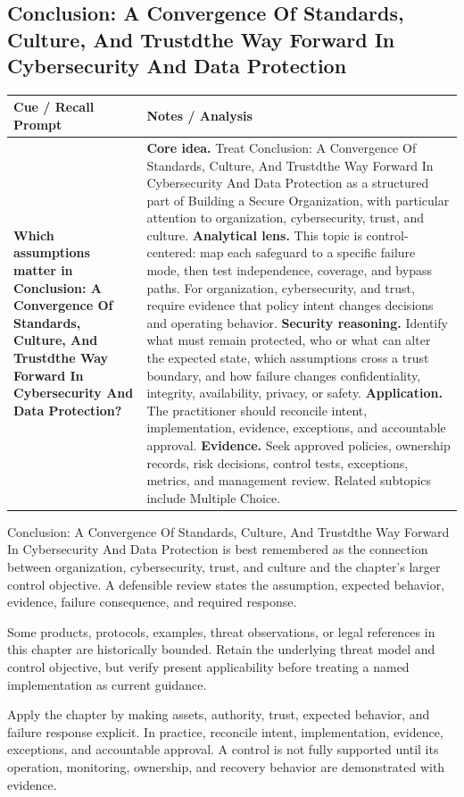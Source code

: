 \documentclass[11pt]{article}
\newcommand{\CornellHeader}{%
\rowcolor{Navy}\color{white}\bfseries Cue / Recall Prompt & \color{white}\bfseries Notes / Analysis\\\hline}
\newcommand{\CornellRow}[2]{%
\cellcolor{CueGray}\RaggedRight\textbf{#1} & \RaggedRight #2\\\hline}
\begin{document}
\subsection*{Conclusion: A Convergence Of Standards, Culture, And Trustdthe Way Forward In Cybersecurity And Data Protection}
\begin{longtable}{>{\RaggedRight\arraybackslash}p{}|>{\RaggedRight\arraybackslash}p{}}
\CornellHeader
\CornellRow{Which assumptions matter in Conclusion: A Convergence Of Standards, Culture, And Trustdthe Way Forward In Cybersecurity And Data Protection?}{\textbf{Core idea.} Treat Conclusion: A Convergence Of Standards, Culture, And Trustdthe Way Forward In Cybersecurity And Data Protection as a structured part of Building a Secure Organization, with particular attention to organization, cybersecurity, trust, and culture. \textbf{Analytical lens.} This topic is control-centered: map each safeguard to a specific failure mode, then test independence, coverage, and bypass paths. For organization, cybersecurity, and trust, require evidence that policy intent changes decisions and operating behavior. \textbf{Security reasoning.} Identify what must remain protected, who or what can alter the expected state, which assumptions cross a trust boundary, and how failure changes confidentiality, integrity, availability, privacy, or safety. \textbf{Application.} The practitioner should reconcile intent, implementation, evidence, exceptions, and accountable approval. \textbf{Evidence.} Seek approved policies, ownership records, risk decisions, control tests, exceptions, metrics, and management review. Related subtopics include Multiple Choice.}
\end{longtable}
\begin{topicsummary}
Conclusion: A Convergence Of Standards, Culture, And Trustdthe Way Forward In Cybersecurity And Data Protection is best remembered as the connection between organization, cybersecurity, trust, and culture and the chapter's larger control objective. A defensible review states the assumption, expected behavior, evidence, failure consequence, and required response.
\end{topicsummary}
\begin{historybox}
Some products, protocols, examples, threat observations, or legal references in this chapter are historically bounded. Retain the underlying threat model and control objective, but verify present applicability before treating a named implementation as current guidance.
\end{historybox}
\begin{defensebox}
Apply the chapter by making assets, authority, trust, expected behavior, and failure response explicit. In practice, reconcile intent, implementation, evidence, exceptions, and accountable approval. A control is not fully supported until its operation, monitoring, ownership, and recovery behavior are demonstrated with evidence.
\end{defensebox}
\end{document}
